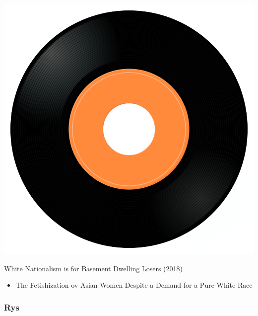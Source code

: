\begin{minipage}[t]{0.25\textwidth}\vspace{0pt}
\captionsetup{type=figure}
\includegraphics[width=\textwidth]{Images/cover.png}
\caption*{White Nationalism is for Basement Dwelling Losers (2018)}
\end{minipage}
\begin{minipage}[t]{0.25\textwidth}\vspace{0pt}
\begin{itemize}[nosep,leftmargin=1em,labelwidth=*,align=left]
	\setlength{\itemsep}{0pt}
	\item The Fetishization ov Asian Women Despite a Demand for a Pure White Race
\end{itemize}
\end{minipage}

\subsubsection{Rys}

